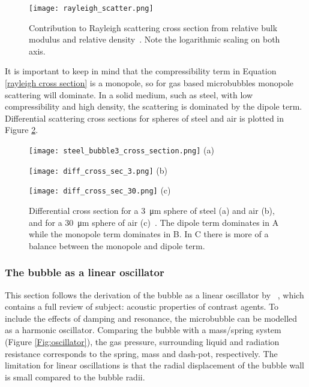 \begin{figure}[h]
  \centering
  \texttt{[image: rayleigh\_scatter.png]}
  \caption{Contribution to Rayleigh scattering cross section from relative bulk modulus and relative density~\cite{Hoff2000}. Note the logarithmic scaling on both axis.}
  \label{Fig:rayleigh}
\end{figure} 

It is important to keep in mind that the compressibility term in Equation \ref{rayleigh cross section} is a monopole, so for gas based microbubbles monopole scattering will dominate. In a solid medium, such as steel, with low compressibility and high density, the scattering is dominated by the dipole term. Differential scattering cross sections for spheres of steel and air is plotted in Figure \ref{fig:diff cross_sec}.
\begin{figure}[h]
	\centering
	    \begin{minipage}[b]{0.4\textwidth}
	    	\centering
			\texttt{[image: steel\_bubble3\_cross\_section.png]}
			    (a)
		\end{minipage}%
    	\begin{minipage}[b]{0.4\textwidth}
    		\centering
			\texttt{[image: diff\_cross\_sec\_3.png]}
			(b)
		\end{minipage}%
		\begin{minipage}[b]{0.4\textwidth}
			\texttt{[image: diff\_cross\_sec\_30.png]}
			(c)
		\end{minipage}%
		
  \caption{Differential cross section for a \SI{3}{\micro\meter} sphere of steel (a) and air (b), and for a \SI{30}{\micro\meter} sphere of air (c)~\cite{Healey2012}. The dipole term dominates in A while the monopole term dominates in B. In C there is more of a balance between the monopole and dipole term.}
  \label{fig:diff cross_sec}
\end{figure} 




\subsubsection{The bubble as a linear oscillator}
This section follows the derivation of the bubble as a linear oscillator by ~\citet{Hoff2000}, which contains a full review of subject: acoustic properties of contrast agents. To include the effects of damping and resonance, the microbubble can be modelled as a harmonic oscillator. Comparing the bubble with a mass/spring system (Figure \ref{Fig:oscillator}), the gas pressure, surrounding liquid and radiation resistance corresponds to the spring, mass and dash-pot, respectively. The limitation for linear oscillations is that the radial displacement of the bubble wall is small compared to the bubble radii. 

